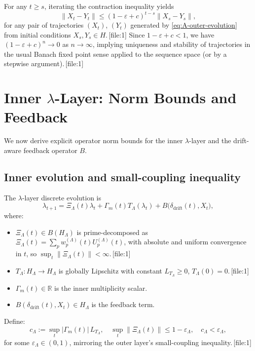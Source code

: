 \documentclass[11pt]{article}
\begin{document}
For any $t\ge s$, iterating the contraction inequality yields
\[
\|X_t - Y_t\|
\le (1-\varepsilon+c)^{t-s} \|X_s-Y_s\|,
\]
for any pair of trajectories $(X_t)$, $(Y_t)$ generated by \eqref{eq:A-outer-evolution} from initial conditions $X_s,Y_s\in H$.\,[file:1] Since $1-\varepsilon+c<1$, we have $(1-\varepsilon+c)^n\to 0$ as $n\to\infty$, implying uniqueness and stability of trajectories in the usual Banach fixed point sense applied to the sequence space (or by a stepwise argument).\,[file:1]

\section{Inner $\lambda$-Layer: Norm Bounds and Feedback}

We now derive explicit operator norm bounds for the inner $\lambda$-layer and the drift-aware feedback operator $B$.

\subsection{Inner evolution and small-coupling inequality}

The $\lambda$-layer discrete evolution is
\begin{equation}
\lambda_{t+1} = \Xi_\Lambda(t)\lambda_t + \Gamma_m(t) T_\Lambda(\lambda_t) 
                + B\bigl(\delta_{\mathrm{drift}}(t), X_t\bigr),
\label{eq:A-inner-evolution}
\end{equation}
where:
\begin{itemize}[nosep]
  \item $\Xi_\Lambda(t)\in B(H_\Lambda)$ is prime-decomposed as $\Xi_\Lambda(t)=\sum_p w^{(\Lambda)}_p(t) U^{(\Lambda)}_p(t)$, with absolute and uniform convergence in $t$, so $\sup_t\|\Xi_\Lambda(t)\|<\infty$.\,[file:1]
  \item $T_\Lambda:H_\Lambda\to H_\Lambda$ is globally Lipschitz with constant $L_{T_\Lambda}\ge 0$, $T_\Lambda(0)=0$.\,[file:1]
  \item $\Gamma_m(t)\in\mathbb{R}$ is the inner multiplicity scalar.
  \item $B(\delta_{\mathrm{drift}}(t),X_t)\in H_\Lambda$ is the feedback term.
\end{itemize}

Define:
\begin{equation}
c_\Lambda := \sup_t |\Gamma_m(t)|\,L_{T_\Lambda},
\quad
\sup_t\|\Xi_\Lambda(t)\|\le 1-\varepsilon_\Lambda,\quad
c_\Lambda < \varepsilon_\Lambda,
\label{eq:A-inner-small-coupling}
\end{equation}
for some $\varepsilon_\Lambda\in(0,1)$, mirroring the outer layer's small-coupling inequality.\,[file:1]
\end{document}
